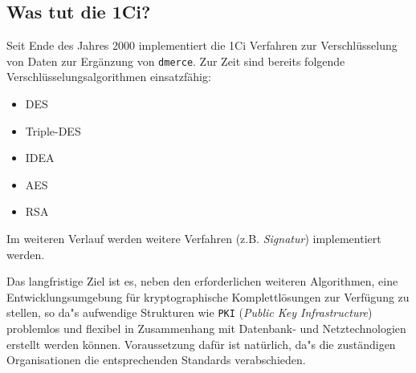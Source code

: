 \subsection{Was tut die 1Ci?}

Seit Ende des Jahres 2000 implementiert die 1Ci Verfahren zur
Verschl\"usselung von Daten zur Erg\"anzung von \texttt{dmerce}.  Zur
Zeit sind bereits folgende Verschl\"usselungsalgorithmen
einsatzf\"ahig:

\begin{itemize}
\item DES
\item Triple-DES
\item IDEA
\item AES
\item RSA
\end{itemize}

Im weiteren Verlauf werden weitere Verfahren (z.B. \textit{Signatur})
implementiert werden.

Das langfristige Ziel ist es, neben den erforderlichen weiteren Algorithmen, eine Entwicklungsumgebung
f\"ur kryptographische Komplettl\"osungen zur Verf\"ugung zu stellen, so da"s aufwendige Strukturen
wie \texttt{PKI} (\textit{Public Key Infrastructure}) problemlos und flexibel in Zusammenhang mit 
Datenbank- und Netztechnologien erstellt werden k\"onnen. Voraussetzung daf\"ur ist nat\"urlich,
da"s die zust\"andigen Organisationen die entsprechenden Standards verabschieden.
